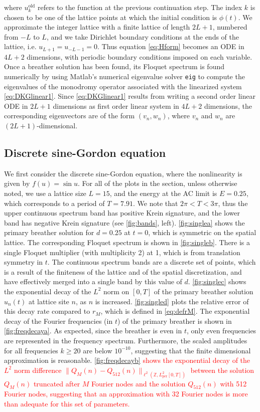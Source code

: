 \documentclass[12pt,reqno]{amsart}
\def\Z{{\mathbb Z}}
\def\per{\textrm{per}}
\theoremstyle{definition}
\newcommand{\revised}[1]{ \textcolor{red}{#1} }
\begin{document}
where $u_k^\text{old}$ refers to the function at the previous continuation step. The index $k$ is chosen to be one of the lattice points at which the initial condition is $\phi(t)$. We approximate the integer lattice with a finite lattice of length $2L+1$, numbered from $-L$ to $L$, and we take Dirichlet boundary conditions at the ends of the lattice, i.e. $u_{L+1} = u_{-L-1} = 0$. Thus equation \cref{eq:Hform} becomes an ODE in $4L+2$ dimensions, with periodic boundary conditions imposed on each variable. Once a breather solution has been found, its Floquet spectrum is found numerically by using Matlab's numerical eigenvalue solver \texttt{eig} to compute the eigenvalues of the monodromy operator associated with the linearized system \cref{eq:DKGlinear1}. Since \cref{eq:DKGlinear1} results from writing a second order linear ODE in $2L+1$ dimensions as first order linear system in $4L+2$ dimensions, the corresponding eigenvectors are of the form $(v_n, w_n)$, where $v_n$ and $w_n$ are $(2L+1)$-dimensional.

\subsection{Discrete sine-Gordon equation}

We first consider the discrete sine-Gordon equation, where the nonlinearity is given by $f(u) = \sin u$. For all of the plots in the section, unless otherwise noted, we use a lattice size $L = 15$, and the energy at the AC limit is $E = 0.25$, which corresponds to a period of $T = 7.91$. We note that $2 \pi < T < 3 \pi$, thus the upper continuous spectrum band has positive Krein signature, and the lower band has negative Krein signature (see \cref{fig:bands}, left).
\cref{fig:singlea} shows the primary breather solution for $d = 0.25$ at $t = 0$, which is symmetric on the spatial lattice. The corresponding Floquet spectrum is shown in \cref{fig:singleb}. There is a single Floquet multiplier (with multiplicity 2) at 1, which is from translation symmetry in $t$. The continuous spectrum bands are a discrete set of points, which is a result of the finiteness
of the lattice and of the spatial discretization, and have effectively merged into a single band by this value of $d$. 
\cref{fig:singlec} shows the exponential decay of the $L^2$ norm on $[0,T]$ of the primary breather solution $u_n(t)$ at lattice site $n$, as $n$ is increased. \cref{fig:singled} plots the relative error of this decay rate compared to $r_M$, which is defined in \cref{eq:defrM}. The exponential decay of the Fourier frequencies (in $t$) of the primary breather is shown in \cref{fig:freqdecaya}. As expected, since the breather is even in $t$, only even frequencies are represented in the frequency spectrum. Furthermore, the scaled amplitudes for all frequencies $k\geq 20$ are below $10^{-10}$, suggesting that the finite dimensional approximation is reasonable. 
\revised{
\cref{fig:freqdecayb} shows the exponential decay of the $L^2$ norm difference $\| Q_M(n) - Q_{512}(n) \|_{\ell^2(\Z, L^2_\per[0,T])}$ between the solution $Q_M(n)$ truncated after $M$ Fourier nodes and the solution $Q_{512}(n)$ with 512 Fourier nodes, suggesting that an approximation with 32 Fourier nodes is more than adequate for this set of parameters.
}
\end{document}
